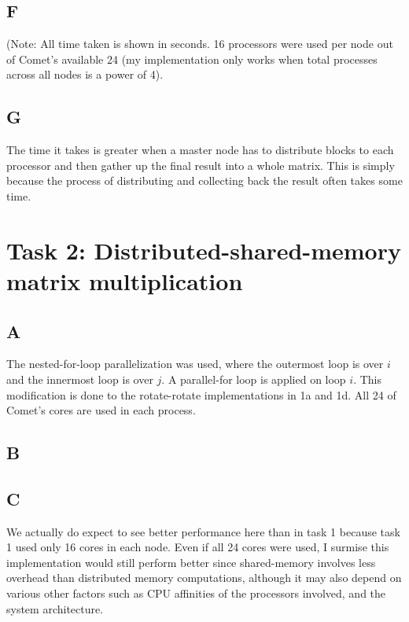 \documentclass[a4paper]{article}
\begin{document}
\par
{}
    
\subsection*{F}
(Note: All time taken is shown in seconds. 16 processors were used per node out of Comet's available 24 (my implementation only works when total processes across all nodes is a power of 4). \\
  
\subsection*{G}
The time it takes is greater when a master node has to distribute blocks to each processor and then gather up the final result into a whole matrix. This is simply because the process of distributing and collecting back the result often takes some time. 

\section*{Task 2: Distributed-shared-memory matrix multiplication}

\subsection*{A}
The nested-for-loop parallelization was used, where the outermost loop is over $i$ and the innermost loop is over $j$. A parallel-for loop is applied on loop $i$. This modification is done to the rotate-rotate implementations in 1a and 1d. All 24 of Comet's cores are used in each process.

\subsection*{B}

\subsection*{C}
We actually do expect to see better performance here than in task 1 because task 1 used only 16 cores in each node. Even if all 24 cores were used, I surmise this implementation would still perform better since shared-memory involves less overhead than distributed memory computations, although it may also depend on various other factors such as CPU affinities of the processors involved, and the system architecture.
\end{document}
